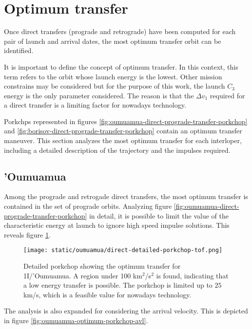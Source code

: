\section{Optimum transfer}

Once direct transfers (prograde and retrograde) have been computed for each pair
of launch and arrival dates, the most optimum transfer orbit can be identified.

It is important to define the concept of optimum transfer. In this context, this
term refers to the orbit whose launch energy is the lowest. Other mission
constrains may be considered but for the purpose of this work, the launch $C_3$
energy is the only parameter considered. The reason is that the $\Delta v_1$
required for a direct transfer is a limiting factor for nowadays technology.

Porkchps represented in figures
\ref{fig:oumuamua-direct-prograde-transfer-porkchop} and
\ref{fig:borisov-direct-prograde-transfer-porkchop} contain an optimum transfer
maneuver. This section analyzes the most optimum transfer for each interloper,
including a detailed description of the trajectory and the impulses required.

\subsection{'Oumuamua}

Among the prograde and retrogade direct transfers, the most optimum transfer is
contained in the set of prograde orbits. Analyzing figure
\ref{fig:oumuamua-direct-prograde-transfer-porkchop} in detail, it is possible
to limit the value of the characteristic energy at launch to ignore high speed
impulse solutions. This reveals figure \ref{fig:oumuamua-optimum-porkchop}.

\begin{figure}[H]
  \centering
  \texttt{[image: static/oumuamua/direct-detailed-porkchop-tof.png]}
        \caption[Detailed porkchop showing the optimum transfer for
        1I/'Oumuamua with the time of flight.]{Detailed porkchop showing the optimum transfer for
        1I/'Oumuamua. A region under 100 km$^2$/s$^2$ is found, indicating that
        a low energy transfer is possible. The porkchop is limited up to $25$
        km/s, which is a feasible value for nowadays technology.}
  \label{fig:oumuamua-optimum-porkchop}
\end{figure}

The analysis is also expanded for considering the arrival velocity. This is
depicted in figure \ref{fig:oumuamua-optimum-porkchop-avl}.

